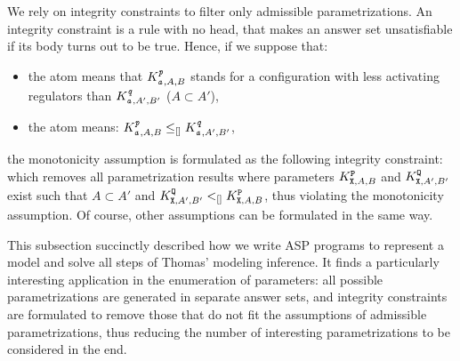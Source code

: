 We rely on integrity constraints to filter only admissible parametrizations.
An integrity constraint is a rule with no head, that makes an answer set unsatisfiable if its body turns out to be true.
Hence, if we suppose that:
\begin{itemize}
  \item the  atom means that $K^{\texttt{\textit{p}}}_{\texttt{\textit{a}},A,B}$ stands for a configuration with less activating regulators than $K^{\texttt{\textit{q}}}_{\texttt{\textit{a}},A',B'}$ (\ie $A \subset A'$),
  \item the  atom means: $K^{\texttt{\textit{p}}}_{\texttt{\textit{a}},A,B} \leq_{[]} K^{\texttt{\textit{q}}}_{\texttt{\textit{a}},A',B'}$,
\end{itemize}
the monotonicity assumption is formulated as the following integrity constraint:
which removes all parametrization results where parameters $K^{\texttt{P}}_{\texttt{X},A,B}$ and $K^{\texttt{Q}}_{\texttt{X},A',B'}$ exist such that $A \subset A'$ and $K^{\texttt{Q}}_{\texttt{X},A',B'} <_{[]} K^{\texttt{P}}_{\texttt{X},A,B}$, thus violating the monotonicity assumption.
Of course, other assumptions can be formulated in the same way.

This subsection succinctly described how we write ASP programs to represent a model and solve all steps of Thomas' modeling inference.
It finds a particularly interesting application in the enumeration of parameters: all possible parametrizations are generated in separate answer sets, and integrity constraints are formulated to remove those that do not fit the assumptions of admissible parametrizations,
thus reducing the number of interesting parametrizations to be considered in the end.
